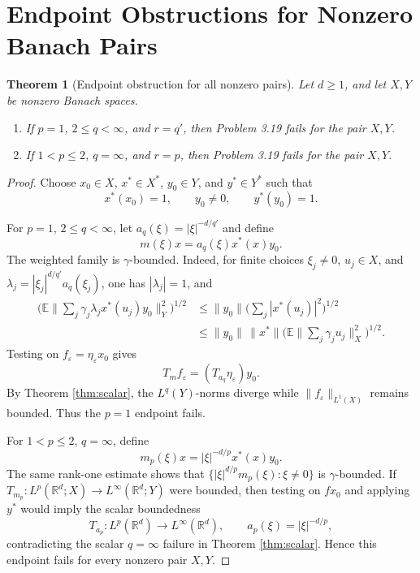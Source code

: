 \documentclass[11pt]{article}
\newtheorem{theorem}{Theorem}
\newcommand{\R}{\mathbb R}
\begin{document}
\section*{Endpoint Obstructions for Nonzero Banach Pairs}

\begin{theorem}[Endpoint obstruction for all nonzero pairs]\label{thm:endpoints}
Let \(d\ge1\), and let \(X,Y\) be nonzero Banach spaces.
\begin{enumerate}
\item If \(p=1\), \(2\le q<\infty\), and \(r=q'\), then Problem 3.19 fails for the pair \(X,Y\).
\item If \(1<p\le2\), \(q=\infty\), and \(r=p\), then Problem 3.19 fails for the pair \(X,Y\).
\end{enumerate}
\end{theorem}

\begin{proof}
Choose \(x_0\in X\), \(x^*\in X^*\), \(y_0\in Y\), and \(y^*\in Y^*\) such that
\[
  x^*(x_0)=1,\qquad y_0\ne0,\qquad y^*(y_0)=1.
\]

For \(p=1\), \(2\le q<\infty\), let \(a_q(\xi)=|\xi|^{-d/q'}\) and define
\[
  m(\xi)x=a_q(\xi)x^*(x)y_0.
\]
The weighted family is \(\gamma\)-bounded.  Indeed, for finite choices \(\xi_j\ne0\), \(u_j\in X\), and \(\lambda_j=|\xi_j|^{d/q'}a_q(\xi_j)\), one has \(|\lambda_j|=1\), and
\begin{align*}
\Big(\mathbb E\Big\|\sum_j\gamma_j\lambda_jx^*(u_j)y_0\Big\|_Y^2\Big)^{1/2}
&\le \|y_0\|\Big(\sum_j |x^*(u_j)|^2\Big)^{1/2}\\
&\le \|y_0\|\,\|x^*\|
   \Big(\mathbb E\Big\|\sum_j\gamma_j u_j\Big\|_X^2\Big)^{1/2}.
\end{align*}
Testing on \(f_\varepsilon=\eta_\varepsilon x_0\) gives
\[
  T_m f_\varepsilon=(T_{a_q}\eta_\varepsilon)y_0.
\]
By Theorem \ref{thm:scalar}, the \(L^q(Y)\)-norms diverge while \(\|f_\varepsilon\|_{L^1(X)}\) remains bounded.  Thus the \(p=1\) endpoint fails.

For \(1<p\le2\), \(q=\infty\), define
\[
  m_p(\xi)x=|\xi|^{-d/p}x^*(x)y_0 .
\]
The same rank-one estimate shows that \(\{|\xi|^{d/p}m_p(\xi):\xi\ne0\}\) is \(\gamma\)-bounded.  If \(T_{m_p}:L^p(\R^d;X)\to L^\infty(\R^d;Y)\) were bounded, then testing on \(fx_0\) and applying \(y^*\) would imply the scalar boundedness
\[
  T_{a_p}:L^p(\R^d)\to L^\infty(\R^d),
  \qquad a_p(\xi)=|\xi|^{-d/p},
\]
contradicting the scalar \(q=\infty\) failure in Theorem \ref{thm:scalar}.  Hence this endpoint fails for every nonzero pair \(X,Y\).
\end{proof}
\end{document}
